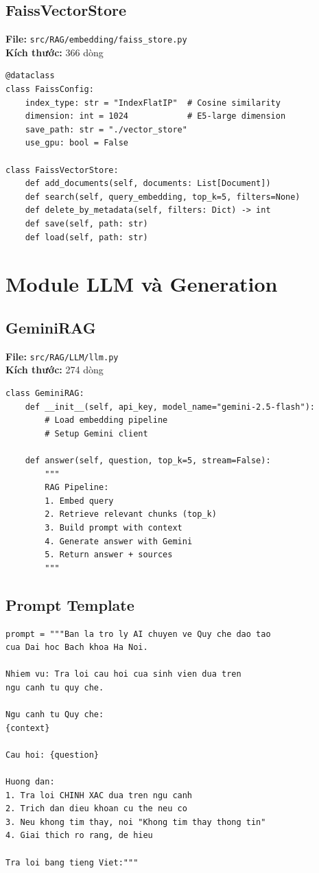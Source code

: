 \documentclass[../DoAn.tex]{subfiles}
\begin{document}
\subsection{FaissVectorStore}
\textbf{File:} \texttt{src/RAG/embedding/faiss\_store.py}\\
\textbf{Kích thước:} 366 dòng

\begin{verbatim}
@dataclass
class FaissConfig:
    index_type: str = "IndexFlatIP"  # Cosine similarity
    dimension: int = 1024            # E5-large dimension
    save_path: str = "./vector_store"
    use_gpu: bool = False

class FaissVectorStore:
    def add_documents(self, documents: List[Document])
    def search(self, query_embedding, top_k=5, filters=None)
    def delete_by_metadata(self, filters: Dict) -> int
    def save(self, path: str)
    def load(self, path: str)
\end{verbatim}

\section{Module LLM và Generation}

\subsection{GeminiRAG}
\textbf{File:} \texttt{src/RAG/LLM/llm.py}\\
\textbf{Kích thước:} 274 dòng

\begin{verbatim}
class GeminiRAG:
    def __init__(self, api_key, model_name="gemini-2.5-flash"):
        # Load embedding pipeline
        # Setup Gemini client
    
    def answer(self, question, top_k=5, stream=False):
        """
        RAG Pipeline:
        1. Embed query
        2. Retrieve relevant chunks (top_k)
        3. Build prompt with context
        4. Generate answer with Gemini
        5. Return answer + sources
        """
\end{verbatim}

\subsection{Prompt Template}
\begin{verbatim}
prompt = """Ban la tro ly AI chuyen ve Quy che dao tao 
cua Dai hoc Bach khoa Ha Noi.

Nhiem vu: Tra loi cau hoi cua sinh vien dua tren 
ngu canh tu quy che.

Ngu canh tu Quy che:
{context}

Cau hoi: {question}

Huong dan:
1. Tra loi CHINH XAC dua tren ngu canh
2. Trich dan dieu khoan cu the neu co
3. Neu khong tim thay, noi "Khong tim thay thong tin"
4. Giai thich ro rang, de hieu

Tra loi bang tieng Viet:"""
\end{verbatim}
\end{document}
